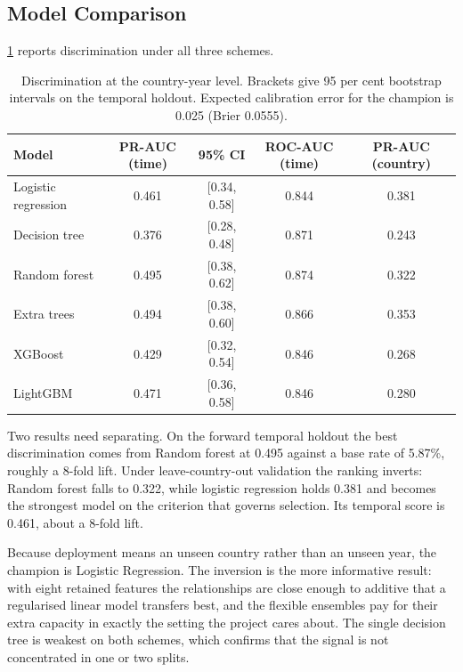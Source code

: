 \documentclass[10pt,openany]{report}
\begin{document}
\subsection{Model Comparison}

\cref{tab:level1} reports discrimination under all three schemes.

\begin{table}[htbp]
\centering
\caption[Discrimination at the country-year level]{Discrimination at the country-year level. Brackets give 95 per cent bootstrap intervals
on the temporal holdout. Expected calibration error for the champion is 0.025 (Brier 0.0555).}
\label{tab:level1}
\small
\begin{tabular}{@{}lcccc@{}}
\toprule
\textbf{Model} & \textbf{PR-AUC (time)} & \textbf{95\% CI} & \textbf{ROC-AUC (time)} &
\textbf{PR-AUC (country)} \\
\midrule
Logistic regression & 0.461 & [0.34, 0.58] & 0.844 & 0.381 \\
Decision tree & 0.376 & [0.28, 0.48] & 0.871 & 0.243 \\
Random forest & 0.495 & [0.38, 0.62] & 0.874 & 0.322 \\
Extra trees & 0.494 & [0.38, 0.60] & 0.866 & 0.353 \\
XGBoost & 0.429 & [0.32, 0.54] & 0.846 & 0.268 \\
LightGBM & 0.471 & [0.36, 0.58] & 0.846 & 0.280 \\
\bottomrule
\end{tabular}
\end{table}

Two results need separating. On the forward temporal holdout the best discrimination comes from
Random forest at 0.495 against a base rate of 5.87\%, roughly a 8-fold lift. Under
leave-country-out validation the ranking inverts: Random forest falls to 0.322, while logistic
regression holds 0.381 and becomes the strongest model on the criterion that governs selection.
Its temporal score is 0.461, about a 8-fold lift.

Because deployment means an unseen country rather than an unseen year, the champion is
Logistic Regression. The inversion is the more informative result: with eight retained features the
relationships are close enough to additive that a regularised linear model transfers best, and the
flexible ensembles pay for their extra capacity in exactly the setting the project cares about. The
single decision tree is weakest on both schemes, which confirms that the signal is not concentrated
in one or two splits.
\end{document}
